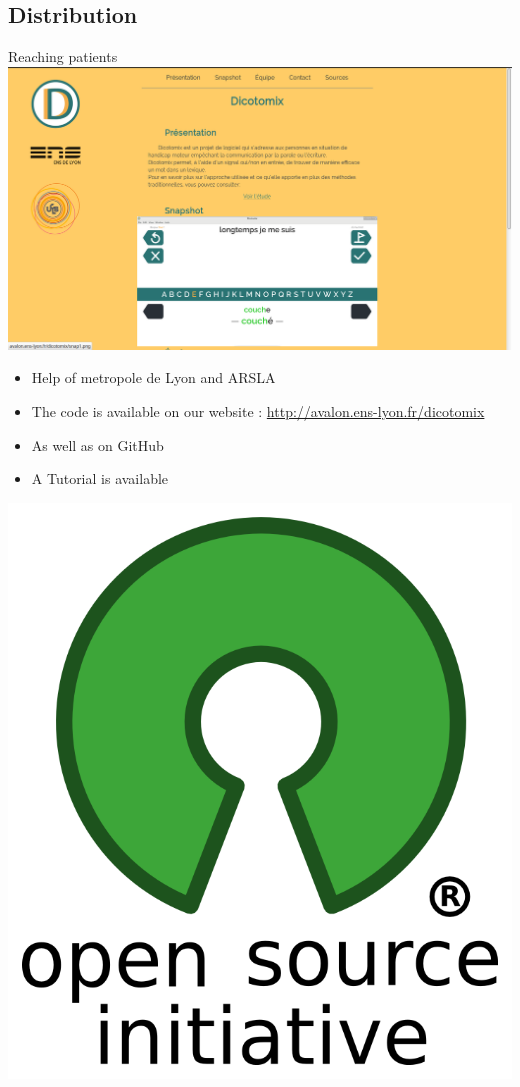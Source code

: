 \documentclass[graphics]{beamer}
\begin{document}
\subsection{Distribution}
\begin{frame}{Reaching patients}
	\hspace{7cm}
	\includegraphics[scale=0.075]{website}\\
	\begin{itemize}
		\item Help of metropole de Lyon and ARSLA
		\item The code is available on our website : \hyperref[http://avalon.ens-lyon.fr/dicotomix]{http://avalon.ens-lyon.fr/dicotomix}
		\item As well as on GitHub
		\item A Tutorial is available
	\end{itemize}
	\hspace{10cm}
	\includegraphics[scale=0.07]{opensource}
\end{frame}
\end{document}
